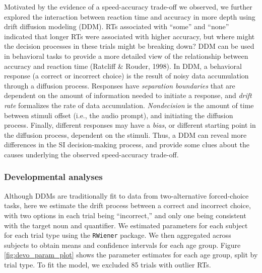 \documentclass[10pt, letterpaper]{article}
\begin{document}
Motivated by the evidence of a speed-accuracy trade-off we observed, we
further explored the interaction between reaction time and accuracy in
more depth using drift diffusion modeling (DDM). RTs associated with
``some'' and ``none'' indicated that longer RTs were associated with
higher accuracy, but where might the decision processes in these trials
might be breaking down? DDM can be used in behavioral tasks to provide a
more detailed view of the relationship between accuracy and reaction
time (Ratcliff \& Rouder, 1998). In DDM, a behavioral response (a
correct or incorrect choice) is the result of noisy data accumulation
through a diffusion process. Responses have \emph{separation boundaries}
that are dependent on the amount of information needed to initiate a
response, and \emph{drift rate} formalizes the rate of data
accumulation. \emph{Nondecision} is the amount of time between stimuli
offset (i.e., the audio prompt), and initiating the diffusion process.
Finally, different responses may have a \emph{bias}, or different
starting point in the diffusion process, dependent on the stimuli. Thus,
a DDM can reveal more differences in the SI decision-making process, and
provide some clues about the causes underlying the observed
speed-accuracy trade-off.

\subsubsection{Developmental analyses}\label{developmental-analyses}

Although DDMs are traditionally fit to data from two-alternative
forced-choice tasks, here we estimate the drift process between a
correct and incorrect choice, with two options in each trial being
``incorrect,'' and only one being consistent with the target noun and
quantifier. We estimated parameters for each subject for each trial type
using the \texttt{RWiener} package. We then aggregated across subjects
to obtain means and confidence intervals for each age group. Figure
\ref{fig:devo_param_plot} shows the parameter estimates for each age
group, split by trial type. To fit the model, we excluded 85 trials with
outlier RTs.
\end{document}
